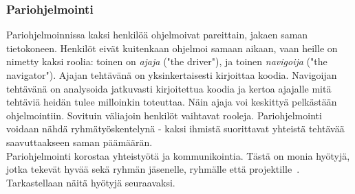 \documentclass[finnish]{../tktltiki2}
\theoremstyle{definition}
\theoremstyle{remark}
\begin{document}
\subsubsection{Pariohjelmointi}

Pariohjelmoinnissa kaksi henkilöä ohjelmoivat pareittain, jakaen saman tietokoneen. Henkilöt eivät kuitenkaan ohjelmoi samaan aikaan, vaan heille on 
nimetty kaksi roolia: toinen on \emph{ajaja} ("the driver"), ja toinen \emph{navigoija} ("the navigator"). Ajajan tehtävänä on yksinkertaisesti 
kirjoittaa koodia. Navigoijan tehtävänä on analysoida jatkuvasti kirjoitettua koodia ja kertoa ajajalle mitä tehtäviä heidän tulee milloinkin 
toteuttaa. Näin ajaja voi keskittyä pelkästään ohjelmointiin. Sovituin väliajoin henkilöt vaihtavat rooleja. Pariohjelmointi voidaan nähdä 
ryhmätyöskentelynä - kaksi ihmistä suorittavat yhteistä tehtävää saavuttaakseen saman päämäärän.~\cite{Shore:2007:AAD:1407480}\\

Pariohjelmointi korostaa yhteistyötä ja kommunikointia. Tästä on monia hyötyjä, jotka tekevät hyvää sekä ryhmän jäsenelle, ryhmälle että 
projektille~\cite{Begel:2008:PPW:1414004.1414026}. Tarkastellaan näitä hyötyjä seuraavaksi. 
\end{document}
